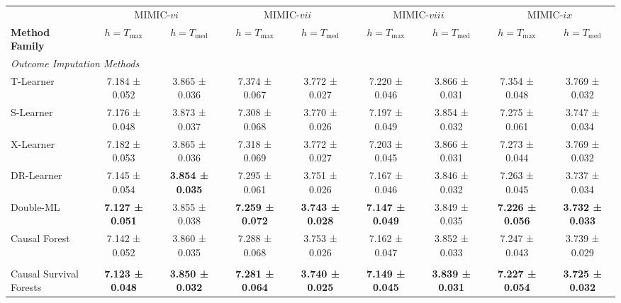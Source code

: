 \begin{table}[htbp]
{\begin{adjustbox}{angle=90,max height=0.95\textheight,center}
\begin{minipage}{\textheight}
    

    \par\noindent\begin{adjustbox}{max width=\linewidth}\begin{minipage}[c]{\linewidth}
    \centering
    \begin{adjustbox}{max width=\linewidth}\begin{tabular}{l cc cc cc cc}
        \toprule
        & \multicolumn{2}{c}{MIMIC-$vi$} 
        & \multicolumn{2}{c}{MIMIC-$vii$}
        & \multicolumn{2}{c}{MIMIC-$viii$}
        & \multicolumn{2}{c}{MIMIC-$ix$} \\
        \cmidrule(lr){2-3}
        \cmidrule(lr){4-5}
        \cmidrule(lr){6-7}
        \cmidrule(lr){8-9}
        \textbf{Method Family} 
        & $h=T_{\max}$ & $h=T_{\text{med}}$
        & $h=T_{\max}$ & $h=T_{\text{med}}$
        & $h=T_{\max}$ & $h=T_{\text{med}}$
        & $h=T_{\max}$ & $h=T_{\text{med}}$ \\ \midrule
        \multicolumn{7}{l}{\textit{Outcome Imputation Methods}} \\
        T-Learner & 7.184 ± 0.052 & 3.865 ± 0.036 & 7.374 ± 0.067 & 3.772 ± 0.027 & 7.220 ± 0.046 & 3.866 ± 0.031 & 7.354 ± 0.048 & 3.769 ± 0.032 \\ 
        S-Learner & 7.176 ± 0.048 & 3.873 ± 0.037 & 7.308 ± 0.068 & 3.770 ± 0.026 & 7.197 ± 0.049 & 3.854 ± 0.032 & 7.275 ± 0.061 & 3.747 ± 0.034 \\ 
        X-Learner & 7.182 ± 0.053 & 3.865 ± 0.036 & 7.318 ± 0.069 & 3.772 ± 0.027 & 7.203 ± 0.045 & 3.866 ± 0.031 & 7.273 ± 0.044 & 3.769 ± 0.032 \\ 
        DR-Learner & 7.145 ± 0.054 & \textbf{3.854 ± 0.035} & 7.295 ± 0.061 & 3.751 ± 0.026 & 7.167 ± 0.046 & 3.846 ± 0.032 & 7.263 ± 0.045 & 3.737 ± 0.034 \\
        Double-ML & \textbf{7.127 ± 0.051} & 3.855 ± 0.038 & \textbf{7.259 ± 0.072} & \textbf{3.743 ± 0.028} & \textbf{7.147 ± 0.049} & 3.849 ± 0.035 & \textbf{7.226 ± 0.056} & \textbf{3.732 ± 0.033} \\
        Causal Forest & 7.142 ± 0.052 & 3.860 ± 0.035 & 7.288 ± 0.068 & 3.753 ± 0.026 & 7.162 ± 0.047 & 3.852 ± 0.033 & 7.247 ± 0.043 & 3.739 ± 0.029 \\ 
        \addlinespace
        \multicolumn{7}{l}{\textit{Direct-Survival CATE Methods}} \\
        Causal Survival Forests & \textbf{7.123 ± 0.048} & \textbf{3.850 ± 0.032} & \textbf{7.281 ± 0.064} & \textbf{3.740 ± 0.025} & \textbf{7.149 ± 0.045} & \textbf{3.839 ± 0.031} & \textbf{7.227 ± 0.054} & \textbf{3.725 ± 0.032} \\

\end{tabular}
\end{adjustbox}
\end{minipage}
\end{adjustbox}
\end{minipage}
\end{adjustbox}}
\end{table}
